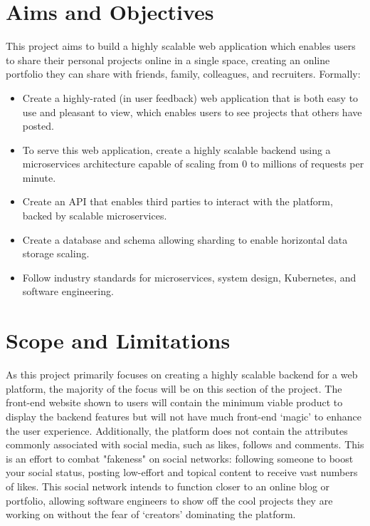 \section{Aims and Objectives}
\label{sec:intro-aims}
This project aims to build a highly scalable web application which enables users to share their personal projects online in a single space, creating an online portfolio they can share with friends, family, colleagues, and recruiters.
Formally:
\begin{itemize}
    \item Create a highly-rated (in user feedback) web application that is both easy to use and pleasant to view, which enables users to see projects that others have posted.
    \item To serve this web application, create a highly scalable backend using a microservices architecture capable of scaling from 0 to millions of requests per minute.
    \item Create an API that enables third parties to interact with the platform, backed by scalable microservices.
    \item Create a database and schema allowing sharding to enable horizontal data storage scaling.
    \item Follow industry standards for microservices, system design, Kubernetes, and software engineering.
\end{itemize}

\section{Scope and Limitations}
\label{sec:intro-scope}
As this project primarily focuses on creating a highly scalable backend for a web platform, the majority of the focus will be on this section of the project. 
The front-end website shown to users will contain the minimum viable product to display the backend features but will not have much front-end `magic' to enhance the user experience.
Additionally, the platform does not contain the attributes commonly associated with social media, such as likes, follows and comments.
This is an effort to combat "fakeness" on social networks: following someone to boost your social status, posting low-effort and topical content to receive vast numbers of likes.
This social network intends to function closer to an online blog or portfolio, allowing software engineers to show off the cool projects they are working on without the fear of `creators' dominating the platform. 

